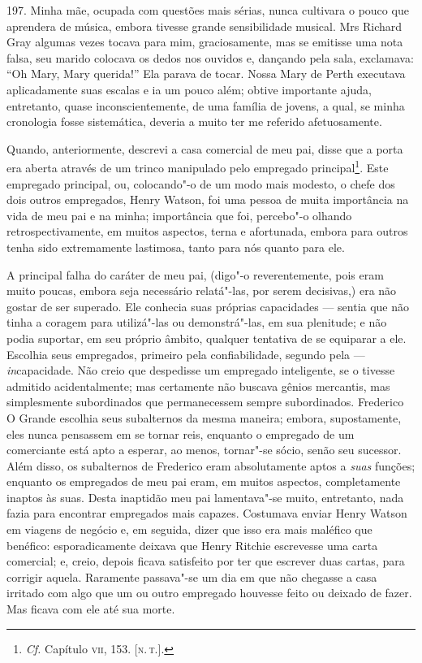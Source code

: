 197. Minha mãe, ocupada com questões mais sérias, nunca cultivara o
pouco que aprendera de música, embora tivesse grande sensibilidade
musical. Mrs Richard Gray algumas vezes tocava para mim, graciosamente,
mas se emitisse uma nota falsa, seu marido colocava os dedos nos ouvidos
e, dançando pela sala, exclamava: ``Oh Mary, Mary querida!'' Ela parava
de tocar. Nossa Mary de Perth executava aplicadamente suas escalas e ia
um pouco além; obtive importante ajuda, entretanto, quase
inconscientemente, de uma família de jovens, a qual, se minha cronologia
fosse sistemática, deveria a muito ter me referido afetuosamente.

Quando, anteriormente, descrevi a casa comercial de meu pai, disse que a
porta era aberta através de um trinco manipulado pelo empregado
principal\footnote{\emph{Cf.} Capítulo \textsc{vii}, 153. {[}\textsc{n.\,t.}{]}.}. Este
empregado principal, ou, colocando"-o de um modo mais modesto, o chefe
dos dois outros empregados, Henry Watson, foi uma pessoa de muita
importância na vida de meu pai e na minha; importância que foi,
percebo"-o olhando retrospectivamente, em muitos aspectos, terna e
afortunada, embora para outros tenha sido extremamente lastimosa, tanto
para nós quanto para ele.

A principal falha do caráter de meu pai, (digo"-o reverentemente, pois
eram muito poucas, embora seja necessário relatá"-las, por serem
decisivas,) era não gostar de ser superado. Ele conhecia suas próprias
capacidades --- sentia que não tinha a coragem para utilizá"-las ou
demonstrá"-las, em sua plenitude; e não podia suportar, em seu próprio
âmbito, qualquer tentativa de se equiparar a ele. Escolhia seus
empregados, primeiro pela confiabilidade, segundo pela ---
\emph{in}capacidade. Não creio que despedisse um empregado inteligente,
se o tivesse admitido acidentalmente; mas certamente não buscava gênios
mercantis, mas simplesmente subordinados que permanecessem sempre
subordinados. Frederico O Grande escolhia seus subalternos da mesma
maneira; embora, supostamente, eles nunca pensassem em se tornar reis,
enquanto o empregado de um comerciante está apto a esperar, ao menos,
tornar"-se sócio, senão seu sucessor. Além disso, os subalternos de
Frederico eram absolutamente aptos a \emph{suas} funções; enquanto os
empregados de meu pai eram, em muitos aspectos, completamente inaptos às
suas. Desta inaptidão meu pai lamentava"-se muito, entretanto, nada fazia
para encontrar empregados mais capazes. Costumava enviar Henry Watson em
viagens de negócio e, em seguida, dizer que isso era mais maléfico que
benéfico: esporadicamente deixava que Henry Ritchie escrevesse uma carta
comercial; e, creio, depois ficava satisfeito por ter que escrever duas
cartas, para corrigir aquela. Raramente passava"-se um dia em que não
chegasse a casa irritado com algo que um ou outro empregado houvesse
feito ou deixado de fazer. Mas ficava com ele até sua morte.

